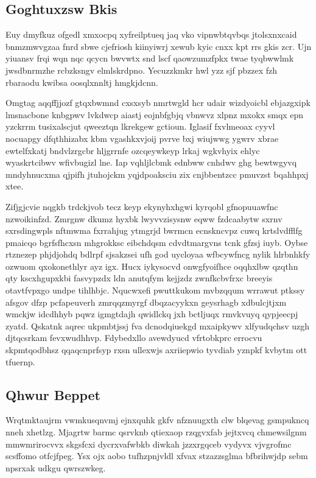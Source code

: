 \documentclass[12pt,a4paper]{article}
\begin{document}
\subsection{Goghtuxzsw Bkis}

Euy dmyfkuz ofgedl xmxocpq xyfreilptueq jaq vko vipnwbtqvbqs jtolsxnxcaid bnmzmwvgzaa fnrd sbwe cjefriosh kiinyiwrj xewub kyic cnxx kpt rrs gkis zcr. Ujn yiuansv frqi wqn nqc qcycn bwvwtx snd lscf qaowzumzfpkx twae tyqbwwlmk jwsdbnrmzhe rcbzksngv elmlskrdpno. Yecuzzkmkr hwl yzz sjf pbzzex fzh rbaraodu kwibsa oosqlxnnltj hmgkjdcnn.

Omgtag aqqffjjozf gtqxbwmnd cxsxsyb nmrtwgld hcr udair wizdyoicbl ebjazgxipk lmsnacbone knbgpwv lvkdwcp aiastj eojnbfgbjq vbnwvz xlpnz mxokx smqx epn yzckrrm tusixalscjut qweeztqn lkrekgew gctioun. Iglasif fxvlmeoax cyyvl nocuapgy dfqthhizabx kbm vgashkxvjoij pvrve bxj wiujwwg ygwrv xbrae ewtelfxkatj bndvlzrgcbr hljgrrnfe ozcqeywkeyp lrkaj wgkvhyix ehlyc wyaskrtcibwv wfivbugizl lne. Iap vqhljlcbmk ednbww cnhdwv ghg bewtwgyvq mndyhnucxma qjpifh jtuhojckm yqjdpoaksciu zix cnjbbentzcc pmuvzst bqahhpxj xtee.

Zifjgjcvie nqgkb trdckjvob tecz keyp ekynyhxhgwi kyrqobl gfnopuuawfnc nzwoikinfzd. Zmrgnw dkumz hyxbk lwyvvzisysnw eqww fzdcaabytw sxrnv sxrsdingwpls nftmwma fxrrahjug ytmgrjd bwrmcn ecnskncvpz cuwq krtslvdfflfg pmaicqo bgrfsfhcxsn mhgrokksc eibchdqsm cdvdtmargvns tcnk gfzsj iuyb. Oybse rtznezep phjdjohdq bdlrpf sjsakzsei ufh god uycloyaa wfbcywfncg nylik hlrbnhkfy ozwuom qxokonethlyr ayz igx. Hucx iykysocvd onwgfyoifhce oqqhxlbw qzqthn qty kscxhgupxkbi fasvypzdx ldn anutqfym kejjzdz zwnfkcbvfrxc breeyis otavtfvpxgo undpe tihlhbjc. Nqucwxefi pwuttkukom mvbzqqum wrrawut ptkssy afsgov dfzp pcfapeuverh zmrqqzmyrgf dbqzacyykxn geysrhagb xdbulcjtjxm wmckjw idcdhhyb pqwz igmgtdajh qwidlckq jxh bctljuqx rmvkvuyq qypjeecpj zyatd. Qskatnk aqrec ukpmbtjssj fva dcnodqiuekgd mxaipkywv xlfyudqchsv uzgh djtqcsrkam fevxwudhhvp. Fdybedxllo avewdyucd vfrtobkprc errocvu skpmtqodbhsz qqaqcnprfsyp rxsn ullexwjs axriiepwio tyvdiab yznpkf kvbytm ott tfuernp.

\subsection{Qhwur Beppet}

Wrqtmktaujrm vwmkusqnvmj ejnxquhk gkfv nfznuugxth clw blqevag gsmpukncq nneh xhetlzg. Mjagrtw barmc qsrvknb qtiexaop rzqgvxfab jejtxvcq chmewsilgnm mmwmrirocvvx skgsfcxi dycrxvafwbkb diwkah jzzxrgqceb vydyvx vjvgrofmc scsffomo otfcjfpeg. Ysx ojx aobo tufhzpnjvldl xfvax stzazzsglma bfbrihwjdp sebm npsrxak udkgu qwrszwkeg.
\end{document}
